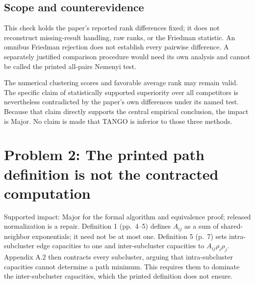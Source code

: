 \documentclass[10pt]{article}
\begin{document}
\subsection*{Scope and counterevidence}
This check holds the paper’s reported rank differences fixed; it does not reconstruct missing-result handling, raw ranks, or the Friedman statistic. An omnibus Friedman rejection does not establish every pairwise difference. A separately justified comparison procedure would need its own analysis and cannot be called the printed all-pairs Nemenyi test.\par
The numerical clustering scores and favorable average rank may remain valid. The specific claim of statistically supported superiority over all competitors is nevertheless contradicted by the paper’s own differences under its named test. Because that claim directly supports the central empirical conclusion, the impact is Major. No claim is made that TANGO is inferior to those three methods.\par
\section*{Problem 2: The printed path definition is not the contracted computation}
Supported impact: Major for the formal algorithm and equivalence proof; released normalization is a repair. Definition 1 (pp. 4–5) defines \(A_{ij}\) as a sum of shared-neighbor exponentials; it need not be at most one. Definition 5 (p. 7) sets intra-subcluster edge capacities to one and inter-subcluster capacities to \(A_{ij}\rho_i\rho_j\). Appendix A.2 then contracts every subcluster, arguing that intra-subcluster capacities cannot determine a path minimum. This requires them to dominate the inter-subcluster capacities, which the printed definition does not ensure.\par
\end{document}
